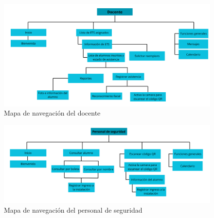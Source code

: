 \begin{figure}[htbp]
	\begin{center}
		\includegraphics[width=1.0\textwidth]{images/docente}
		\caption{Mapa de navegación del docente}
		\label{fig:Mapa de navegación del docente}
	\end{center}
\end{figure}

\clearpage

\begin{figure}[htbp]
	\begin{center}
		\includegraphics[width=.9\textwidth]{images/personalseguridad}
		\caption{Mapa de navegación del personal de seguridad}
		\label{fig:Mapa de navegación del personal de seguridad}
	\end{center}
\end{figure}

\newpage

\newpage


\newpage


\newpage


\newpage


\newpage


\newpage


\newpage


\newpage


\newpage


